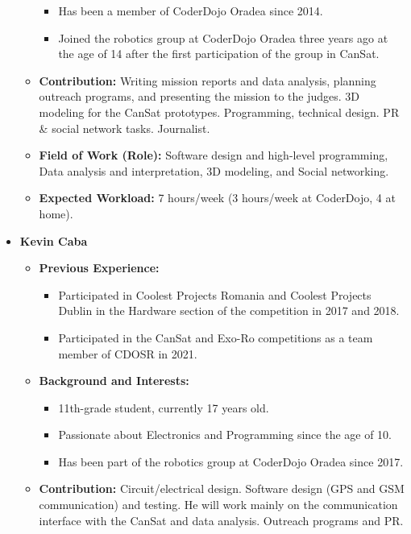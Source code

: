 \documentclass[11pt]{article}
\begin{document}
\begin{itemize}
\begin{itemize}[label=]
\begin{itemize}[label=]
            \item Has been a member of CoderDojo Oradea since 2014.
            \item Joined the robotics group at CoderDojo Oradea three years ago at the age of 14 after the first participation of the group in CanSat.
        \end{itemize}
        \item[\faEdit] \textbf{Contribution:} Writing mission reports and data analysis, planning outreach programs, and presenting the mission to the judges. 3D modeling for the CanSat prototypes. Programming, technical design. PR \& social network tasks. Journalist. 
        \item[\faMicroscope] \textbf{Field of Work (Role):} Software design and high-level programming, Data analysis and interpretation, 3D modeling, and Social networking.
        \item[\faLaptopCode] \textbf{Expected Workload:} 7 hours/week (3 hours/week at CoderDojo, 4 at home).
    \end{itemize}
    \vspace{0.2 cm}
    \item[] \textbf{Kevin Caba}
    \begin{itemize}[label=]
        \item[\faCogs] \textbf{Previous Experience:} 
        \begin{itemize}[label=]
            \item Participated in Coolest Projects Romania and Coolest Projects Dublin in the Hardware section of the competition in 2017 and 2018.
            \item Participated in the CanSat and Exo-Ro competitions as a team member of CDOSR in 2021.
        \end{itemize}
        \item[\faGraduationCap] \textbf{Background and Interests:} 
        \begin{itemize}[label=]
            \item 11th-grade student, currently 17 years old.
            \item Passionate about Electronics and Programming since the age of 10.
            \item Has been part of the robotics group at CoderDojo Oradea since 2017.
        \end{itemize}
        \item[\faEdit] \textbf{Contribution:} Circuit/electrical design. Software design (GPS and GSM communication) and testing. He will work mainly on the communication interface with the CanSat and data analysis. Outreach programs and PR.

\end{itemize}
\end{itemize}
\end{document}
